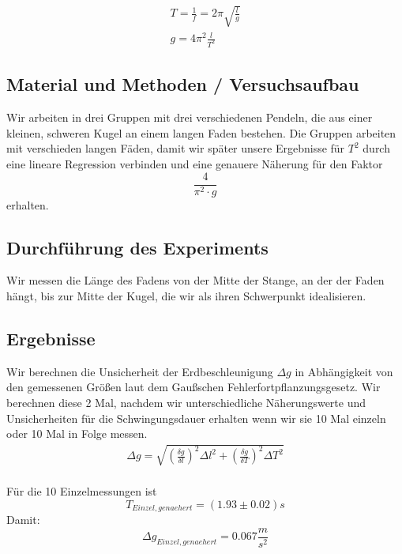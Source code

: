 \documentclass{article}
\begin{document}
\begin{align}
T=\frac{1}{f}=2 \pi\sqrt{\frac{l}{g}} \\
g=4\pi^2\frac{l}{T^2}
\end{align}
\subsection{Material und Methoden / Versuchsaufbau}
Wir arbeiten in drei Gruppen mit drei verschiedenen Pendeln, die aus einer kleinen, schweren Kugel an einem langen Faden bestehen. Die Gruppen arbeiten mit verschieden langen Fäden, damit wir später unsere Ergebnisse für $T^2$ durch eine lineare Regression verbinden und eine genauere Näherung für den Faktor 
\begin{equation*}[!h]
\frac{4}{\pi^2 \cdot g} 
\end{equation*} erhalten. 
\subsection{Durchführung des Experiments}
Wir messen die Länge des Fadens von der Mitte der Stange, an der der Faden hängt, bis zur Mitte der Kugel, die wir als ihren Schwerpunkt idealisieren.
\subsection{Ergebnisse}
Wir berechnen die Unsicherheit der Erdbeschleunigung $\Delta g$ in Abhängigkeit von den gemessenen Größen laut dem Gaußschen Fehlerfortpflanzungsgesetz. Wir berechnen diese 2 Mal, nachdem wir unterschiedliche Näherungswerte und Unsicherheiten für die Schwingungsdauer erhalten wenn wir sie 10 Mal einzeln oder 10 Mal in Folge messen.
\begin{align}
\Delta g=\sqrt{(\frac{\delta g}{\delta l})^2\Delta l^2 + (\frac{\delta g}{\delta T})^2\Delta T^2}
\end{align} \\
Für die 10 Einzelmessungen ist
\begin{equation}
T_{Einzel,genaehert} = (1.93 \pm 0.02)s
\end{equation}
Damit:
\begin{equation}
\Delta g_{Einzel,genaehert} = 0.067 \frac{m}{s^2}
\end{equation}
\end{document}
